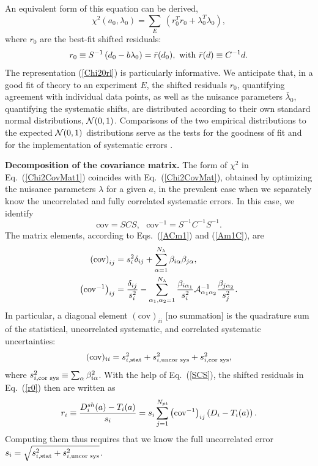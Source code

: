 An equivalent form of this equation can be derived,
\begin{equation}
\chi^{2}(a_{0},\lambda_{0})=\sum_{E}\ \left(r_{0}^{T}r_{0}+\lambda_{0}^{T}\lambda_{0}\right),\label{Chi20rl}
\end{equation}
where $r_{0}$ are the best-fit shifted residuals:
\begin{equation}
r_{0}\equiv S^{-1}\left(d_{0}-b\lambda_{0}\right)=\bar{r}(d_{0}),\mbox{~with~}\bar{r}(d)\equiv C^{-1}d.\label{r0}
\end{equation}
The representation (\ref{Chi20rl}) is particularly informative. We
anticipate that, in a good fit of theory to an experiment $E$, the
shifted residuals $r_{0}$, quantifying agreement with individual
data points, as well as the nuisance parameters $\bar{\lambda}_{0}$,
quantifying the systematic shifts, are distributed according to their
own standard normal distributions, ${\cal N}(0,1)$. Comparisons of
the two empirical distributions to the expected ${\cal N}(0,1)$ distributions
serve as the tests for the goodness of fit and for the implementation
of systematic errors \cite{Kovarik:2019xvh}.

{\bf Decomposition of the covariance matrix.}
%
%
The form of $\chi^2$ in Eq.~(\ref{Chi2CovMat1}) coincides with Eq.~(\ref{Chi2CovMat}),
obtained by optimizing the nuisance parameters $\lambda$ for a given $a$, in the prevalent
case when we separately know the uncorrelated and fully correlated
systematic errors. In this case, we identify
\begin{equation}
\mbox{cov}=SCS,~~~\mbox{cov}^{-1}=S^{-1}C^{-1}S^{-1}.\label{SCS}
\end{equation}
 The matrix elements, according to Eqs.~(\ref{ACm1}) and (\ref{Am1C}),
are
\begin{align}
\left(\mbox{cov}\right)_{ij} & =s_{i}^{2}\delta_{ij}+\sum_{\alpha=1}^{N_{\lambda}}\beta_{i\alpha}\beta_{j\alpha},\label{cov}\\
\left(\mbox{\mbox{cov}}^{-1}\right)_{ij} & =\frac{\delta_{ij}}{s_{i}^{2}}-\sum_{\alpha_1,\alpha_2=1}^{N_{\lambda}}\frac{\beta_{i\alpha_1}}{s_{i}^{2}}{\cal {\cal A}}_{\alpha_1\alpha_2}^{-1}\frac{\beta_{j\alpha_2}}{s_{j}^{2}}.\label{covm1}
\end{align}
In particular, a diagonal element $(\mbox{cov})_{ii}$ {[}no summation{]}
is the quadrature sum of the statistical, uncorrelated systematic,
and correlated systematic uncertainties:
\begin{equation}
(\mbox{cov})_{ii}=s_{i,\mbox{\scriptsize stat}}^{2}+s_{i,\mbox{\scriptsize uncor sys}}^{2}+s_{i,\mbox{\scriptsize cor sys}}^{2},\label{s2i}
\end{equation}
where $s_{i,\mbox{\scriptsize cor sys}}^{2}\equiv\sum_{\alpha}\beta_{i\alpha}^{2}$.
With the help of Eq.~(\ref{SCS}), the shifted residuals in Eq.~(\ref{r0})
then are written as
\begin{equation}
r_{i}\equiv\frac{D_{i}^{sh}(a)-T_{i}(a)}{s_{i}}=s_{i}\sum_{j=1}^{N_{pt}}\left(\mbox{\mbox{cov}}^{-1}\right)_{ij}\left(D_{i}-T_{i}(a)\right).\label{ricov}
\end{equation}
Computing them thus requires that we know the full uncorrelated error $s_{i}=\sqrt{s_{i,\mbox{\scriptsize stat}}^{2}+s_{i,\mbox{\scriptsize uncor sys}}^{2}}$.

